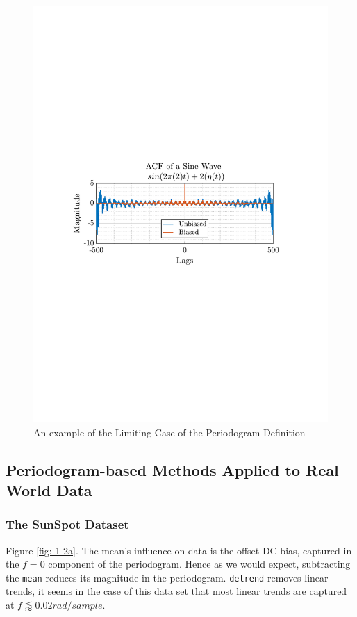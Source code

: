 \documentclass[12pt]{article}
\begin{document}
	\begin{figure}[H]
		\centering
		\includegraphics[trim={2.2cm 11.2cm 3.15cm  11.2cm}, clip, width=\textwidth]{../MATLAB/figures/q1_1b_fig01.pdf} 
		\captionsetup{justification=centering}
		\caption{An example of the Limiting Case of the Periodogram Definition}
		\label{fig: 1-1b}
	\end{figure}
	
	
	\subsection{Periodogram-based Methods Applied to Real–World Data} \label{sec: 1-2-PSD-real-world}
	\subsubsection{The SunSpot Dataset}
	Figure \ref{fig: 1-2a}. The mean's influence on data is the offset DC bias, captured in the $f=0$ component of the periodogram. Hence as we would expect, subtracting the \texttt{mean} reduces its magnitude in the periodogram. \texttt{detrend} removes linear trends, it seems in the case of this data set that most linear trends are captured at $f \lessapprox 0.02 rad/sample$. \\
	
\end{document}
